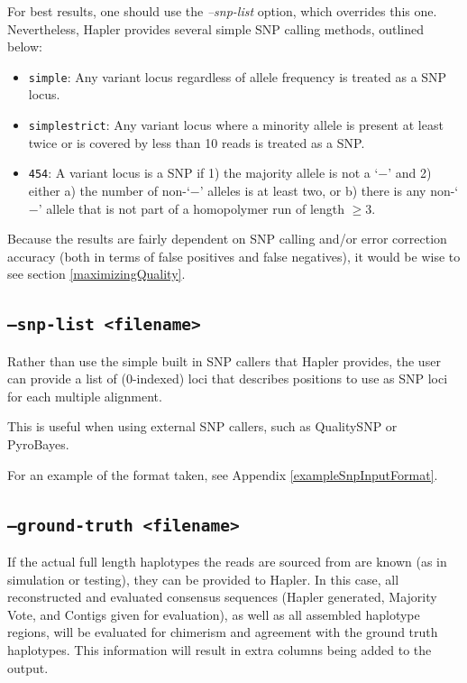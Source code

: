 \documentclass[11pt]{llncs}
\begin{document}
For best results, one should use the \emph{--snp-list} option, which overrides this one. Nevertheless, Hapler provides several simple SNP 
calling methods, outlined below:

\begin{itemize}
	\item \texttt{simple}: Any variant locus regardless of allele frequency is treated as a SNP locus.
	\item \texttt{simplestrict}: Any variant locus where a minority allele is present at least twice or is covered by less than 10 reads is treated as a SNP.
	\item \texttt{454}: A variant locus is a SNP if 1) the majority allele is not a `$-$'
	and 2) either a) the number of non-`$-$' alleles is at least two, or
	b) there is any non-`$-$' allele that is not part of a homopolymer run
	of length $\geq 3$.
\end{itemize}

Because the results are fairly dependent on SNP calling and/or error correction accuracy (both in terms of false positives and false negatives), it would
be wise to see section \ref{maximizingQuality}.

\subsection{\texttt{--snp-list <filename>}}

Rather than use the simple built in SNP callers that Hapler provides, the user can provide a list of (0-indexed) loci that describes positions to
use as SNP loci for each multiple alignment. 

This is useful when using external SNP callers, such as QualitySNP or PyroBayes.

For an example of the format taken, see Appendix \ref{exampleSnpInputFormat}.

\subsection{\texttt{--ground-truth <filename>}}

If the actual full length haplotypes the reads are sourced from are known (as in simulation or testing), they can be provided to Hapler. In this
case, all reconstructed and evaluated consensus sequences (Hapler generated, Majority Vote, and Contigs given for evaluation), as well as all
assembled haplotype regions, will be evaluated for chimerism and agreement with the ground truth haplotypes. This information will result
in extra columns being added to the output.
\end{document}
